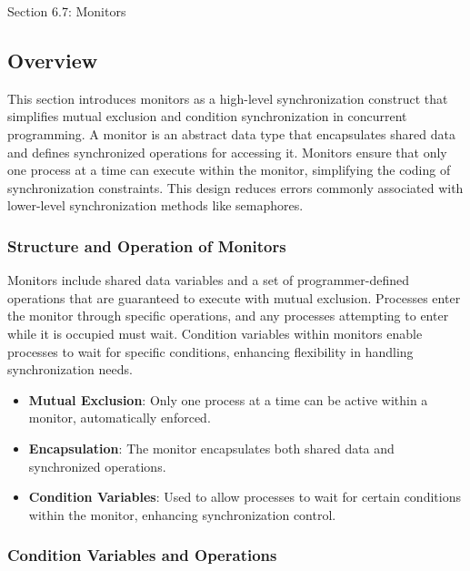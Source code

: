\begin{notes}{Section 6.7: Monitors}
    \subsection*{Overview}

    This section introduces monitors as a high-level synchronization construct that simplifies mutual exclusion and condition synchronization in concurrent programming. A monitor is an abstract data 
    type that encapsulates shared data and defines synchronized operations for accessing it. Monitors ensure that only one process at a time can execute within the monitor, simplifying the coding 
    of synchronization constraints. This design reduces errors commonly associated with lower-level synchronization methods like semaphores.
    
    \subsubsection*{Structure and Operation of Monitors}
    
    Monitors include shared data variables and a set of programmer-defined operations that are guaranteed to execute with mutual exclusion. Processes enter the monitor through specific operations, 
    and any processes attempting to enter while it is occupied must wait. Condition variables within monitors enable processes to wait for specific conditions, enhancing flexibility in handling 
    synchronization needs.
    
    \begin{highlight}
    
        \begin{itemize}
            \item \textbf{Mutual Exclusion}: Only one process at a time can be active within a monitor, automatically enforced.
            \item \textbf{Encapsulation}: The monitor encapsulates both shared data and synchronized operations.
            \item \textbf{Condition Variables}: Used to allow processes to wait for certain conditions within the monitor, enhancing synchronization control.
        \end{itemize}
    
    \end{highlight}
    
    \subsubsection*{Condition Variables and Operations}
    

\end{notes}
